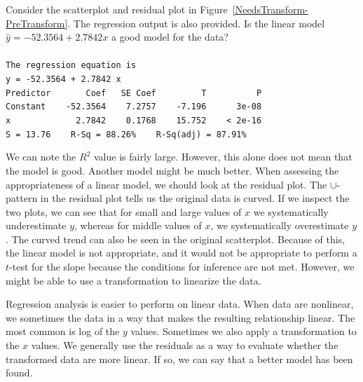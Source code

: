\begin{examplewrap}
\begin{nexample}{Consider the scatterplot and residual plot in Figure~\ref{NeedsTransform-PreTransform}. The regression output is also provided.  Is the linear model $\hat{y} = -52.3564 + 2.7842 x$ a good model for the data?
\\
\\
\texttt{The regression equation is} \\

\texttt{y = -52.3564 + 2.7842 x} \\

\texttt{Predictor \ \ \ \ \ \ Coef \ \ SE Coef \ \ \ \ \ \ \ \ T \ \ \ \ \ \ \ \ \ P} \\
\texttt{Constant \ \ \ -52.3564 \ \ \ 7.2757 \ \ \ -7.196 \ \ \ \ \ 3e-08} \\
\texttt{x \ \ \ \ \ \ \ \ \ \ \ \ 2.7842 \ \ \ 0.1768 \ \ \ 15.752 \ \ \ < 2e-16} \\

\texttt{S = 13.76\ \ \ \ R-Sq = 88.26\% \ \ \ R-Sq(adj) = 87.91\%}
}

We can note the $R^2$ value is fairly large.  However, this alone does not mean that the model is good.  Another model might be much better.  When assessing the appropriateness of a linear model, we should look at the residual plot.  The $\cup$-pattern in the residual plot tells us the original data is curved. If we inspect the two plots, we can see that for small and large values of $x$ we systematically underestimate $y$, whereas for middle values of $x$, we systematically overestimate $y$.  The curved trend can also be seen in the original scatterplot.  Because of this, the linear model is not appropriate, and it would not be appropriate to perform a $t$-test for the slope because the conditions for inference are not met.  However, we might be able to use a transformation to linearize the data.
\end{nexample}
\end{examplewrap}

Regression analysis is easier to perform on linear data.  When data are nonlinear, we sometimes  the data in a way that makes the resulting relationship linear.  The most common  is log of the $y$ values. Sometimes we also apply a transformation to the $x$ values.  We generally use the residuals as a way to evaluate whether the transformed data are more linear. If so, we can say that a better model has been found.


